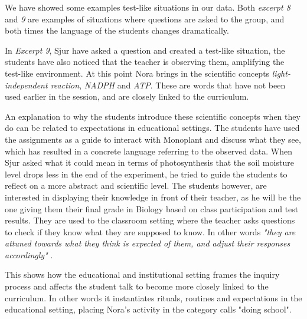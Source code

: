 We have showed some examples test-like situations in our data. Both \emph{excerpt 8} and \emph{9} are examples of situations where questions are asked to the group, and both times the language of the students changes dramatically. 

In \emph{Excerpt 9}, Sjur have asked a question and created a test-like situation, the students have also noticed that the teacher is observing them, amplifying the test-like environment. At this point Nora brings in the scientific concepts \emph{light-independent reaction}, \emph{NADPH} and \emph{ATP}. These are words that have not been used earlier in the session, and are closely linked to the curriculum. 

An explanation to why the students introduce these scientific concepts when they do can be related to expectations in educational settings. The students have used the assignments as a guide to interact with Monoplant and discuss what they see, which has resulted in a concrete language referring to the observed data. When Sjur asked what it could mean in terms of photosynthesis that the soil moisture level drops less in the end of the experiment, he tried to guide the students to reflect on a more abstract and scientific level. The students however, are interested in displaying their knowledge in front of their teacher, as he will be the one giving them their final grade in Biology based on class participation and test results. They are used to the classroom setting where the teacher asks questions to check if they know what they are supposed to know. In other words \emph{"they are attuned towards what they think is expected of them, and adjust their responses accordingly"} \citep{furberg2009socio}. 

This shows how the educational and institutional setting frames the inquiry process and affects the student talk to become more closely linked to the curriculum. In other words it instantiates rituals, routines and expectations in the educational setting, placing Nora's activity in the category \citet{jimenez2000doing} calls "doing school". 


